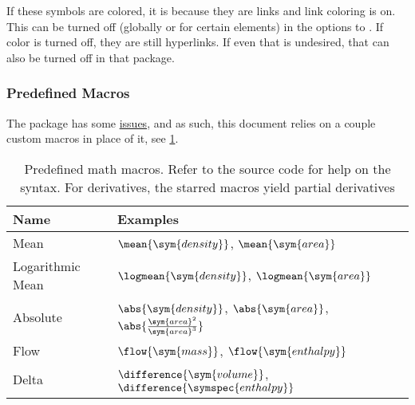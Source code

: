If these symbols are colored, it is because they are links and link coloring is on.
This can be turned off (globally or for certain elements) in the options to
.
If color is turned off, they are still hyperlinks.
If even that is undesired, that can also be turned off in that package.

\subsubsection{Predefined Macros}

The  package has some
\href{https://tex.stackexchange.com/q/471532/120853}{issues},
and as such, this document relies on a couple custom macros in place of it, see
\cref{tab:predefined_math_macros}.

\begin{table}[tbp]
    \caption[Predefined math macros]{%
        Predefined math macros.
        Refer to the source code for help on the syntax.
        For derivatives, the starred macros yield partial derivatives%
    }
    \label{tab:predefined_math_macros}
    \centering
    {\renewcommand*{\arraystretch}{1.8}%
    \small
    \begin{tabular}{%
            @{}
            l
            l
            @{}
        }
        \toprule
        Name                                & Examples                                                                                       \\
        \midrule
        Mean                                & \(\mean{\sym{density}}\), \(\mean{\sym{area}}\)                                                \\
        Logarithmic Mean                    & \(\logmean{\sym{density}}\), \(\logmean{\sym{area}}\)                                          \\
        Absolute\footnotemark[1]          & \(\abs{\sym{density}}\), \(\abs{\sym{area}}\), \(\abs{\frac{\sym{area}^{2}}{\sym{area}^{3}}}\) \\
        Flow                                & \(\flow{\sym{mass}}\), \(\flow{\sym{enthalpy}}\)                                               \\
        Delta                               & \(\difference{\sym{volume}}\), \(\difference{\symspec{enthalpy}}\)                             \\

\end{tabular}}
\end{table}
